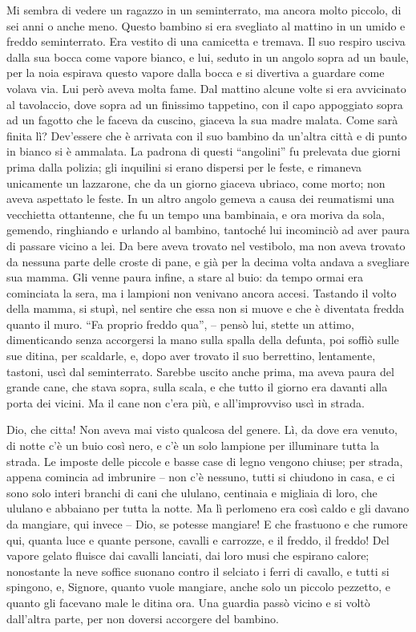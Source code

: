\documentclass[a4paper, 12pt]{article}
\begin{document}
\begin{linenumbers}
	Mi sembra di vedere un ragazzo in un seminterrato, ma ancora molto piccolo, di sei anni o anche meno.
	Questo bambino si era svegliato al mattino in un umido e freddo seminterrato.
	Era vestito di una camicetta e tremava.
	Il suo respiro usciva dalla sua bocca come vapore bianco, e lui, seduto in un angolo sopra ad un baule, per la noia espirava questo vapore dalla bocca e si divertiva a guardare come volava via.
	Lui però aveva molta fame.
	Dal mattino alcune volte si era avvicinato al tavolaccio, dove sopra ad un finissimo tappetino, con il capo appoggiato sopra ad un fagotto che le faceva da cuscino, giaceva la sua madre malata.
	Come sarà finita lì? Dev'essere che è arrivata con il suo bambino da un'altra città e di punto in bianco si è ammalata.
	La padrona di questi ``angolini'' fu prelevata due giorni prima dalla polizia;
	gli inquilini si erano dispersi per le feste, e rimaneva unicamente un lazzarone, che da un giorno giaceva ubriaco, come morto; non aveva aspettato le feste.
	In un altro angolo gemeva a causa dei reumatismi una vecchietta ottantenne, che fu un tempo una bambinaia, e ora moriva da sola, gemendo, ringhiando e urlando al bambino, tantoché lui incominciò ad aver paura di passare vicino a lei.
	Da bere aveva trovato nel vestibolo, ma non aveva trovato da nessuna parte delle croste di pane, e già per la decima volta andava a svegliare sua mamma.
	Gli venne paura infine, a stare al buio: da tempo ormai era cominciata la sera, ma i lampioni non venivano ancora accesi.
	Tastando il volto della mamma, si stupì, nel sentire che essa non si muove e che è diventata fredda quanto il muro.
	``Fa proprio freddo qua'', -- pensò lui, stette un attimo, dimenticando senza accorgersi la mano sulla spalla della defunta, poi soffiò sulle sue ditina, per scaldarle, e, dopo aver trovato il suo berrettino, lentamente, tastoni, uscì dal seminterrato.
	Sarebbe uscito anche prima, ma aveva paura del grande cane, che stava sopra, sulla scala, e che tutto il giorno era davanti alla porta dei vicini.
	Ma il cane non c'era più, e all'improvviso uscì in strada.
	
	Dio, che citta!
	Non aveva mai visto qualcosa del genere.
	Lì, da dove era venuto, di notte c'è un buio così nero, e c'è un solo lampione per illuminare tutta la strada.
	Le imposte delle piccole e basse case di legno vengono chiuse;
	per strada, appena comincia ad imbrunire -- non c'è nessuno, tutti si chiudono in casa, e ci sono solo interi branchi di cani che ululano, centinaia e migliaia di loro, che ululano e abbaiano per tutta la notte.
	Ma lì perlomeno era così caldo e gli davano da mangiare, qui invece -- Dio, se potesse mangiare!
	E che frastuono e che rumore qui, quanta luce e quante persone, cavalli e carrozze, e il freddo, il freddo!
	Del vapore gelato fluisce dai cavalli lanciati, dai loro musi che espirano calore;
	nonostante la neve soffice suonano contro il selciato i ferri di cavallo, e tutti si spingono, e, Signore, quanto vuole mangiare, anche solo un piccolo pezzetto, e quanto gli facevano male le ditina ora.
	Una guardia passò vicino e si voltò dall'altra parte, per non doversi accorgere del bambino.
	

\end{linenumbers}
\end{document}
